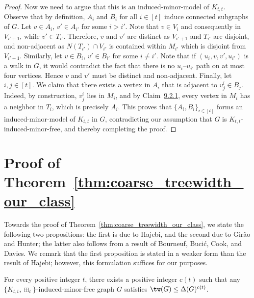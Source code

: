 \begin{proof}
    Now we need to argue that this is an induced-minor-model of $K_{t,t}$. Observe that by definition, $A_i$ and $B_i$ for all $i\in [t]$ induce connected subgraphs of $G$. Let $v\in A_i$, $v'\in A_{i'}$ for some $i > i'$. Note that $v\in V_{i}$ and consequently in $V_{i'+1}$, while $v'\in T_{i'}$. Therefore, $v$ and $v'$ are distinct as $V_{i'+1}$ and $T_{i'}$ are disjoint, and non-adjacent as $N(T_{i'}) \cap V_{i'}$ is contained within $M_{i'}$ which is disjoint from $V_{i'+1}$. Similarly, let $v\in B_i$, $v'\in B_{i'}$ for some $i \neq i'$. Note that if $(u_i, v, v', u_{i'})$ is a walk in $G$, it would contradict the fact that there is no $u_i$--$u_{i'}$ path on at most four vertices. Hence $v$ and $v'$ must be distinct and non-adjacent. Finally, let $i, j \in [t]$. We claim that there exists a vertex in $A_i$ that is adjacent to $v_j^i \in B_j$. Indeed, by construction, $v_j^i$ lies in $M_i$, and by Claim~\hyperref[claim:recursive_layering]{9.2.1}, every vertex in $M_i$ has a neighbor in $T_i$, which is precisely $A_i$. This proves that $\{A_i, B_i\}_{i \in [t]}$ forms an induced-minor-model of $K_{t,t}$ in $G$, contradicting our assumption that $G$ is $K_{t,t}$-induced-minor-free, and thereby completing the proof.
\end{proof}

\section{Proof of Theorem~\ref{thm:coarse_treewidth_our_class}}
Towards the proof of Theorem~\ref{thm:coarse_treewidth_our_class}, we state the following two propositions: the first is due to Hajebi, and the second due to Gir\~{a}o and Hunter; the latter also follows from a result of Bourneuf, Buci\'{c}, Cook, and Davies. We remark that the first proposition is stated in a weaker form than the result of Hajebi; however, this formulation suffices for our purposes.



\begin{proposition}\label{prop:our_class_deg_tw_bound}
    For every positive integer $t$, there exists a positive integer $c(t)$ such that any $\{K_{t,t}, \boxplus_t\}$-induced-minor-free graph $G$ satisfies $\tw(G)\leq \Delta(G)^{c(t)}$.
\end{proposition}


